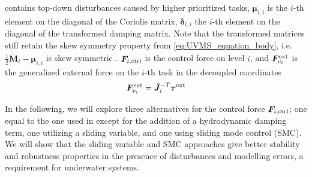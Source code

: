 \documentclass[../main.tex]{subfiles}
\begin{document}
contains top-down disturbances caused by higher prioritized tasks, $\bm{\mu}_{i,i}$ is the $i$-th element on the diagonal of the Coriolis matrix, $\bm{\delta}_{i,i}$ the $i$-th element on the diagonal of the transformed damping matrix.  Note that the transformed matrices still retain the skew symmetry property from \eqref{eq:UVMS_equation_body},  i.e. $\frac{1}{2}\dot{\bar{\bm{M}}}_i - \bm{\mu}_{i,i}$ is skew symmetric \cite{dietrich2020}. $\bm{F}_{i, {\rm ctrl}}$ is the control force on level $i$, and $\bm{F}_{v_i}^{\rm ext}$ is the generalized external force on the $i$-th task in the decoupled coordinates
\begin{equation}
    \label{eq:F_ext}
    \bm{F}^{\rm ext}_{v_i} = \bar{\bm{J}}^{-T}_i \bm{\tau}^{\rm ext}
\end{equation}

In the following, we will explore three alternatives for the control force $\bm{F}_{i, {\rm ctrl}}$; one equal to the one used in \cite{dietrich2020} except for the addition of a hydrodynamic damping term, one utilizing a sliding variable, and one using sliding mode control (SMC). We will show that the sliding variable and SMC approaches give better stability and robustness properties in the presence of disturbances and modelling errors, a requirement for underwater systems.
\end{document}
